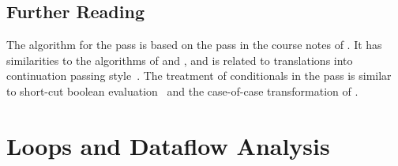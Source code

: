 \documentclass[7x10]{TimesAPriori_MIT}%
\begin{document}
\section{Further Reading}
\label{sec:cond-further-reading}

The algorithm for the  pass is based on the
 pass in the course notes of
\citet{Dybvig:2010aa}.
%
It has similarities to the algorithms of \citet{Danvy:2003fk} and
\citet{Appel:2003fk}, and is related to translations into continuation
passing
style~\citep{Wijngaarden:1966,Fischer:1972,reynolds72:_def_interp,Plotkin:1975,Friedman:2001}.
%
The treatment of conditionals in the  pass is
similar to short-cut boolean
evaluation~\citep{Logothetis:1981,Aho:2006wb,Clarke:1989,Danvy:2003fk}
and the case-of-case transformation of \citet{PeytonJones:1998}.

\chapter{Loops and Dataflow Analysis}
\label{ch:Lwhile}


\end{document}

